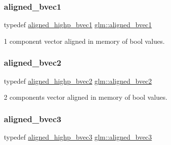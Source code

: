 \subsubsection{\texorpdfstring{aligned\+\_\+bvec1}{aligned\_bvec1}}
{\footnotesize\ttfamily typedef \hyperlink{group__gtc__type__aligned_ga92b3b4333bdc881b8ae27414162df481}{aligned\+\_\+highp\+\_\+bvec1} \hyperlink{group__gtc__type__aligned_ga7db5fd015b60682f3fdfe9cab47188dd}{glm\+::aligned\+\_\+bvec1}}



1 component vector aligned in memory of bool values. 

\mbox{\label{group__gtc__type__aligned_ga58579cb7fcfb892d0ae1f085327ae2ca}} 
\subsubsection{\texorpdfstring{aligned\+\_\+bvec2}{aligned\_bvec2}}
{\footnotesize\ttfamily typedef \hyperlink{group__gtc__type__aligned_gafa71bded1fc2dd68608207de49a96870}{aligned\+\_\+highp\+\_\+bvec2} \hyperlink{group__gtc__type__aligned_ga58579cb7fcfb892d0ae1f085327ae2ca}{glm\+::aligned\+\_\+bvec2}}



2 components vector aligned in memory of bool values. 

\mbox{\label{group__gtc__type__aligned_ga853a573b554adb2181d9ca23907f8a85}} 
\subsubsection{\texorpdfstring{aligned\+\_\+bvec3}{aligned\_bvec3}}
{\footnotesize\ttfamily typedef \hyperlink{group__gtc__type__aligned_ga224220a3fc5e5220141a568270cfb405}{aligned\+\_\+highp\+\_\+bvec3} \hyperlink{group__gtc__type__aligned_ga853a573b554adb2181d9ca23907f8a85}{glm\+::aligned\+\_\+bvec3}}



